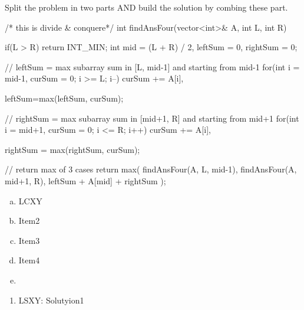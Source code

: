     

\begin{solution}
    Split the problem in two parts AND build the solution by combing these part.
    
    \begin{code}
    /* this is divide & conquere*/
    int findAnsFour(vector<int>& A, int L, int R){
        if(L > R) return INT_MIN;
        int mid = (L + R) / 2, leftSum = 0, rightSum = 0;

        // leftSum = max subarray sum in [L, mid-1] and starting from mid-1
        for(int i = mid-1, curSum = 0; i >= L; i--)
            curSum += A[i],
        
        leftSum=max(leftSum, curSum);

        // rightSum = max subarray sum in [mid+1, R] and starting from mid+1
        for(int i = mid+1, curSum = 0; i <= R; i++)
            curSum += A[i],
        
        rightSum = max(rightSum, curSum);        

        // return max of 3 cases 
        return max({ findAnsFour(A, L, mid-1), findAnsFour(A, mid+1, R), leftSum + A[mid] + rightSum });
    }	
    \end{code}
\end{solution}


\begin{pratice}

    \begin{enumerate}[(a)]
    \item LCXY
    \item Item2
    \item Item3
    \item Item4
    \item \lipsum[1]
\end{enumerate}

\end{pratice}

\begin{praticeHints}
    \begin{enumerate}
        \item LSXY: Solutyion1
    \end{enumerate}
\end{praticeHints}